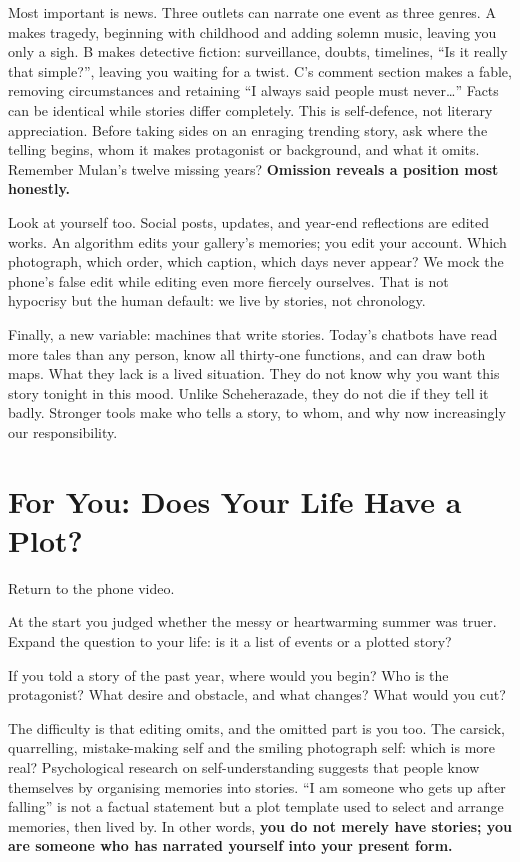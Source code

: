 Most important is news. Three outlets can narrate one event as three genres. A makes tragedy, beginning with childhood and adding solemn music, leaving you only a sigh. B makes detective fiction: surveillance, doubts, timelines, ``Is it really that simple?'', leaving you waiting for a twist. C's comment section makes a fable, removing circumstances and retaining ``I always said people must never\ldots'' Facts can be identical while stories differ completely. This is self-defence, not literary appreciation. Before taking sides on an enraging trending story, ask where the telling begins, whom it makes protagonist or background, and what it omits. Remember Mulan's twelve missing years? \textbf{Omission reveals a position most honestly.}

Look at yourself too. Social posts, updates, and year-end reflections are edited works. An algorithm edits your gallery's memories; you edit your account. Which photograph, which order, which caption, which days never appear? We mock the phone's false edit while editing even more fiercely ourselves. That is not hypocrisy but the human default: we live by stories, not chronology.

Finally, a new variable: machines that write stories. Today's chatbots have read more tales than any person, know all thirty-one functions, and can draw both maps. What they lack is a lived situation. They do not know why you want this story tonight in this mood. Unlike Scheherazade, they do not die if they tell it badly. Stronger tools make who tells a story, to whom, and why now increasingly our responsibility.

\section{For You: Does Your Life Have a Plot?}
Return to the phone video.

At the start you judged whether the messy or heartwarming summer was truer. Expand the question to your life: is it a list of events or a plotted story?

If you told a story of the past year, where would you begin? Who is the protagonist? What desire and obstacle, and what changes? What would you cut?

The difficulty is that editing omits, and the omitted part is you too. The carsick, quarrelling, mistake-making self and the smiling photograph self: which is more real? Psychological research on self-understanding suggests that people know themselves by organising memories into stories. ``I am someone who gets up after falling'' is not a factual statement but a plot template used to select and arrange memories, then lived by. In other words, \textbf{you do not merely have stories; you are someone who has narrated yourself into your present form.}

